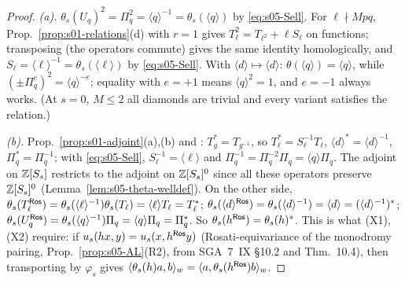 \begin{proof}
\emph{(a).} $\theta_s(U_q)^2=\Pi_q^2=\langle q\rangle^{-1}=\theta_s(\langle q\rangle)$ by \eqref{eq:s05-Sell}. For $\ell\nmid Mpq$,
Prop.~\ref{prop:s01-relations}(d) with $r=1$ gives $T_\ell^2=T_{\ell^2}+\ell S_\ell$ on functions; transposing (the operators commute) gives the same
identity homologically, and $S_\ell=\langle\ell\rangle^{-1}=\theta_s(\langle\ell\rangle)$ by \eqref{eq:s05-Sell}. With $\langle d\rangle\mapsto\langle d\rangle$:
$\theta(\langle q\rangle)=\langle q\rangle$, while $(\pm\Pi_q^{e})^2=\langle q\rangle^{-e}$; equality with $e=+1$ means $\langle q\rangle^2=1$, and $e=-1$ always works.
(At $s=0$, $M\le2$ all diamonds are trivial and every variant satisfies the relation.)

\emph{(b).} Prop.~\ref{prop:s01-adjoint}(a),(b) and : $T_g^*=T_{g^{-1}}$, so $T_\ell^*=S_\ell^{-1}T_\ell$,
$\langle d\rangle^*=\langle d\rangle^{-1}$, $\Pi_q^*=\Pi_q^{-1}$; with \eqref{eq:s05-Sell}, $S_\ell^{-1}=\langle\ell\rangle$ and $\Pi_q^{-1}=\Pi_q^{-2}\Pi_q=\langle q\rangle\Pi_q$.
The adjoint on $\mathbb{Z}[S_s]$ restricts to the adjoint on $\mathbb{Z}[S_s]^0$ since all these operators preserve $\mathbb{Z}[S_s]^0$ (Lemma~\ref{lem:s05-theta-welldef}).
On the other side, $\theta_s(T_\ell^{\mathsf{Ros}})=\theta_s(\langle\ell\rangle^{-1})\theta_s(T_\ell)=\langle\ell\rangle T_\ell=T_\ell^*$;
$\theta_s(\langle d\rangle^{\mathsf{Ros}})=\theta_s(\langle d\rangle^{-1})=\langle d\rangle=(\langle d\rangle^{-1})^*$; $\theta_s(U_q^{\mathsf{Ros}})=\theta_s(\langle q\rangle^{-1})\Pi_q=\langle q\rangle\Pi_q=\Pi_q^*$.
So $\theta_s(h^{\mathsf{Ros}})=\theta_s(h)^*$. This is what (X1), (X2) require: if $u_s(hx,y)=u_s(x,h^{\mathsf{Ros}} y)$ (Rosati-equivariance of the
monodromy pairing, Prop.~\ref{prop:s05-AL}(R2), \stpmc{} from SGA~7~IX \S10.2 and Thm.~10.4), then transporting by $\varphi_s$ gives
$\langle\theta_s(h)a,b\rangle_w=\langle a,\theta_s(h^{\mathsf{Ros}})b\rangle_w$.


\end{proof}

